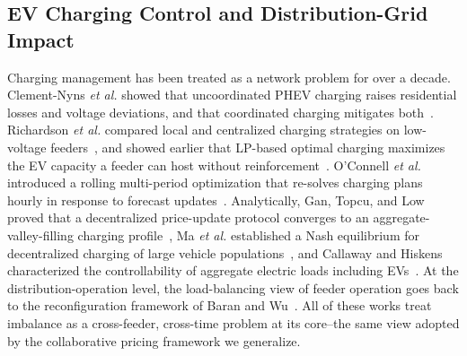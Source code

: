\documentclass[10pt,journal]{IEEEtran}
\begin{document}
\subsection{EV Charging Control and Distribution-Grid Impact}
Charging management has been treated as a network problem for over a
decade. Clement-Nyns \emph{et al.} showed that uncoordinated PHEV charging
raises residential losses and voltage deviations, and that coordinated
charging mitigates both~\cite{clement2010}. Richardson \emph{et al.}
compared local and centralized charging strategies on low-voltage
feeders~\cite{richardson2012tsg}, and showed earlier that LP-based optimal
charging maximizes the EV capacity a feeder can host without
reinforcement~\cite{richardson2012tpwrs}. O'Connell \emph{et al.}
introduced a rolling multi-period optimization that re-solves charging
plans hourly in response to forecast
updates~\cite{oconnell2014}. Analytically, Gan, Topcu, and Low proved that a
decentralized price-update protocol converges to an aggregate-valley-filling
charging profile~\cite{gan2013}, Ma \emph{et al.} established a Nash
equilibrium for decentralized charging of large vehicle
populations~\cite{ma2013}, and Callaway and Hiskens characterized the
controllability of aggregate electric loads including
EVs~\cite{callaway2011}. At the distribution-operation level, the
load-balancing view of feeder operation goes back to the reconfiguration
framework of Baran and Wu~\cite{baran1989}. All of these works treat
imbalance as a cross-feeder, cross-time problem at its core--the same view
adopted by the collaborative pricing framework we generalize.
\end{document}
